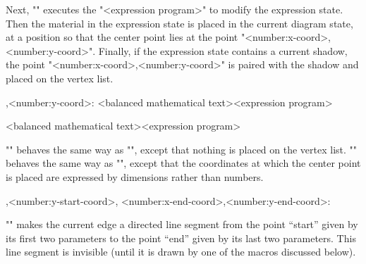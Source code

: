 \documentclass[11pt]{article}
\begin{document}
Next, "\vertex" executes the "<expression program>" to modify the expression
state.  Then the material in the expression state is placed in the
current diagram state, at a position so that the center point lies at
the point "<number:x-coord>,<number:y-coord>".  Finally, if the expression
state contains a current shadow, the point "<number:x-coord>,<number:y-coord>"
is paired with the shadow and placed on the vertex list.
\begin{myverb}
    ,<number:y-coord>:
        {<balanced mathematical text>}{<expression program>}

        {<balanced mathematical text>}{<expression program>}
\end{myverb}
"\place" behaves the same way as "\vertex", except that nothing is placed on the
vertex list. "\placed" behaves the same way as "\place", except that the
coordinates at which the center point is placed are expressed by dimensions
rather than numbers.
\begin{myverb}
    ,<number:y-start-coord>,
        <number:x-end-coord>,<number:y-end-coord>:
\end{myverb}
"\setedge" makes the current edge a directed line segment from the point
``start'' given by its first two parameters to the point ``end'' given
by its last two parameters.  This line segment is invisible (until it
is drawn by one of the macros discussed below).
\end{document}
